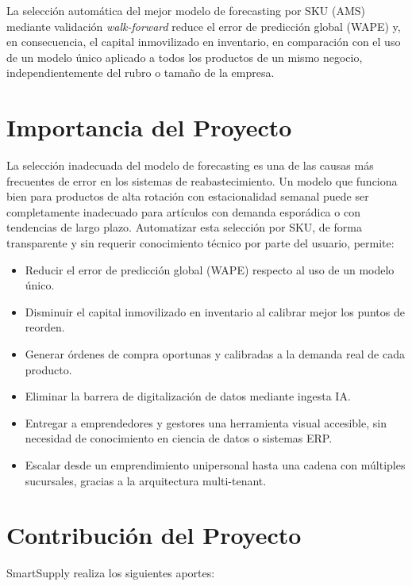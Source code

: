\documentclass[12pt, a4paper]{report}
\begin{document}
La selección automática del mejor modelo de forecasting por SKU (AMS) mediante
validación \textit{walk-forward} reduce el error de predicción global (WAPE) y, en
consecuencia, el capital inmovilizado en inventario, en comparación con el uso de un
modelo único aplicado a todos los productos de un mismo negocio, independientemente
del rubro o tamaño de la empresa.

\section{Importancia del Proyecto}

La selección inadecuada del modelo de forecasting es una de las causas más frecuentes
de error en los sistemas de reabastecimiento. Un modelo que funciona bien para productos
de alta rotación con estacionalidad semanal puede ser completamente inadecuado para
artículos con demanda esporádica o con tendencias de largo plazo. Automatizar esta
selección por SKU, de forma transparente y sin requerir conocimiento técnico por parte
del usuario, permite:

\begin{itemize}
  \item Reducir el error de predicción global (WAPE) respecto al uso de un modelo único.
  \item Disminuir el capital inmovilizado en inventario al calibrar mejor los puntos de
        reorden.
  \item Generar órdenes de compra oportunas y calibradas a la demanda real de cada
        producto.
  \item Eliminar la barrera de digitalización de datos mediante ingesta IA.
  \item Entregar a emprendedores y gestores una herramienta visual accesible, sin
        necesidad de conocimiento en ciencia de datos o sistemas ERP.
  \item Escalar desde un emprendimiento unipersonal hasta una cadena con múltiples
        sucursales, gracias a la arquitectura multi-tenant.
\end{itemize}

\section{Contribución del Proyecto}

SmartSupply realiza los siguientes aportes:
\end{document}
